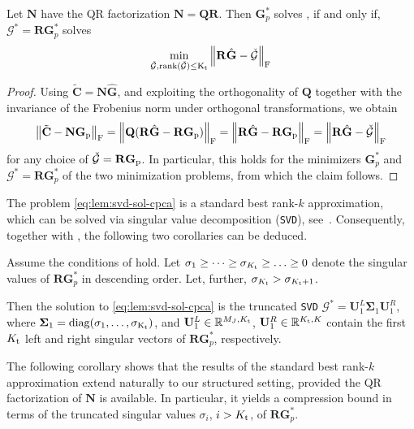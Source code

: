 \documentclass[onefignum,onetabnum]{siamart251104}
\newcommand{\bt}[1]{{\mathbf{#1}}}
\newcommand{\prol}[1]{{{#1}_{\rm{p}}}} %
\newcommand{\thi}[1]{{{#1}_{\rm{t}}}}	%
\newcommand{\R}{\mathbb{R}}
\newcommand{\acro}[1]{{\texttt{#1}}}  %
\newcommand{\Cp}{{\bt{C}}}
\newcommand{\mydiag}{\rm{diag}}
\begin{document}
\begin{lemma} \label{lem:svd-sol-cpca}
Let ${\bt{N}}$ have the QR factorization $\bt{N} = \bt{Q} \bt{R}$.
Then $\bt{G}_p^*$ solves , if and only if, $\mathcal{G}^* =  \bt{R} \bt{G}_p^*$ solves
\begin{align}\label{eq:lem:svd-sol-cpca}
\min_{ {\check{\mathcal{G}}}, \rm{rank}(\check{\mathcal{G}}) \leq \thi{K}}  \left \| \bt{R}  \hat{\bt{G}} - \check{\mathcal{G}} \right\|_{\rm{F}}
\end{align}
\end{lemma}
\begin{proof}
Using $\tilde{\Cp} = {\bt{N}} \hat{\bt{G}}$, and exploiting the orthogonality of $\bt{Q}$ together with the invariance of the Frobenius norm under orthogonal transformations, we obtain
\begin{align*}
 \left \| \tilde{\Cp} - \bt{N} \prol{\bt{G}} \right\|_{\rm{F}} =  \left \| \bt{Q} (  \bt{R} \hat{\bt{G}} -  \bt{R} \prol{\bt{G}} ) \right\|_{\rm{F}} = \left \|   \bt{R} \hat{\bt{G}} - {\bt{R}} \prol{\bt{G}}  \right\|_{\rm{F}} = \left \|   \bt{R} \hat{\bt{G}} - \check{\mathcal{G}}  \right\|_{\rm{F}}
\end{align*}
for any choice of $\check{\mathcal{G}} =  \bt{R} \prol{\bt{G}}$. In particular, this holds for the minimizers $\bt{G}_p^*$ and $\mathcal{G}^* = \bt{R} \bt{G}_p^*$ of the two minimization problems, from which the claim follows.
\end{proof}
The problem \eqref{eq:lem:svd-sol-cpca} is a standard best rank-$k$ approximation, which can be solved via singular value decomposition (\acro{SVD}), see~\cite{book:GolubVanLoan}. Consequently, together with , the following two corollaries can be deduced.
\begin{crllr}\label{cor:truncSVD}
Assume the conditions of  hold. Let $\sigma_1 \ge \dots \ge \sigma_{\thi{K}} \ge \ldots \ge 0$ denote the singular values of $\bt{R}\bt{G}_p^*$ in descending order. Let, further, $\sigma_{\thi{K}} > \sigma_{\thi{K}+1}$. 

Then the solution to \eqref{eq:lem:svd-sol-cpca} is the truncated \acro{SVD} $\mathcal{G}^* = \bt{U}_1^L \boldsymbol{\Sigma}_1 \bt{U}_1^R$, where $\boldsymbol{\Sigma}_1 = \mydiag(\sigma_1,\dots,\sigma_{\thi{K}})$, and $\bt{U}_1^L \in \R^{M_J , \thi{K}}$, $\bt{U}_1^R \in \R^{\thi{K} , K}$ contain the first $\thi{K}$ left and right singular vectors of $\bt{R}\bt{G}_p^*$, respectively.
\end{crllr}
The following corollary shows that the results of the standard best rank-$k$ approximation extend naturally to our structured setting, provided the QR factorization of $\bt{N}$ is available. In particular, it yields a compression bound in terms of the truncated singular values $\sigma_i$, $i> \thi{K}$, of $\bt{R}\bt{G}_p^*$.
\end{document}
